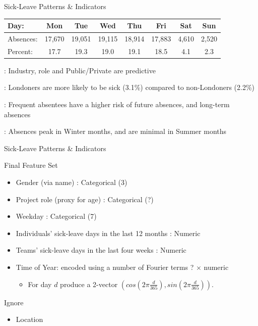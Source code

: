 \documentclass[xcolor=dvipsnames]{beamer}
\begin{document}
\begin{frame}{Sick-Leave Patterns \& Indicators}
{\begin{description}
{\begin{tabular}{| l | c | c | c | c | c | c | c | }
  \hline			
  Day:      & Mon    & Tue    & Wed    & Thu    & Fri    & Sat   & Sun \\ \hline
  Absences: & 17,670 & 19,051 & 19,115 & 18,914 & 17,883 & 4,610 & 2,520 \\
  Percent: & 17.7 & 19.3 & 19.0 & 19.1 & 18.5 & 4.1 & 2.3 \\
  \hline  
\end{tabular}
        }
    \item<6->[Profession]: Industry, role and Public/Private are predictive
    \item<6->[Location]: Londoners are more likely to be sick (3.1\%) compared to non-Londoners (2.2\%)
    \item<7->[Recurrence]: Frequent absentees have a higher risk of future absences, and long-term absences
    \item<8->[Season]: Absences peak in Winter months, and are minimal in Summer months
    \end{description}
}
    
\end{frame}


\begin{frame}{Sick-Leave Patterns \& Indicators}

Final Feature Set
\begin{itemize}
    \item Gender (via name) : Categorical (3)
    \item Project role (proxy for age) : Categorical (?)
    \item Weekday : Categorical (7)
    \item Individuals' sick-leave days in the last  12 months : Numeric
    \item Teams' sick-leave days in the last four weeks : Numeric
    \item Time of Year: encoded using a number of Fourier terms ? $\times$ numeric
    \begin{itemize}
        \item For day $d$ produce a 2-vector $\left(cos(2\pi \frac{d}{365}), sin(2\pi \frac{d}{365})\right)$.
    \end{itemize}
\end{itemize}
\medskip
Ignore
\begin{itemize}
\item Location
\end{itemize}


\end{frame}
\end{document}
